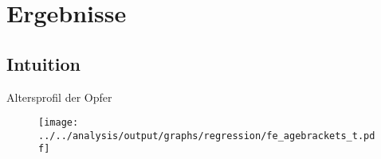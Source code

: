 \documentclass[usenames,dvipsnames,ngerman]{beamer} %
\begin{document}
%
%	


	
\section{Ergebnisse}
\subsection{Intuition}


	\begin{frame}{Altersprofil der Opfer}\label{link_regression_age_profile}
		\begin{figure}[H]\centering
			\texttt{[image: ../../analysis/output/graphs/regression/fe\_agebrackets\_t.pdf]}
		\end{figure}
		\hyperlink{link_regression_age_profile_per_gender}{}
	\end{frame}
\end{document}
